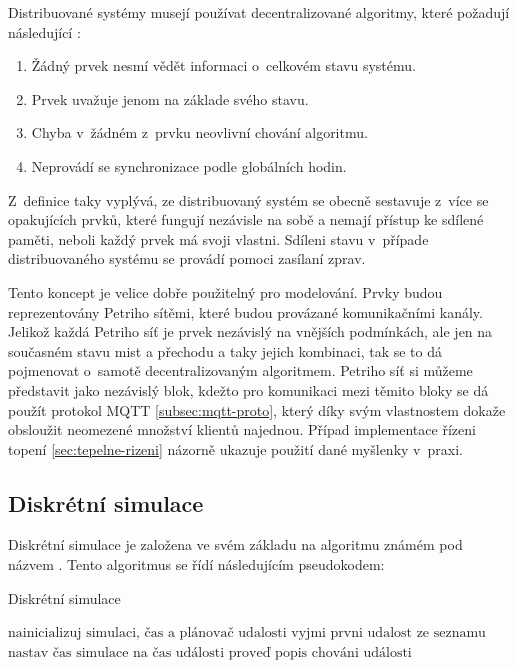 Distribuované systémy musejí používat decentralizované algoritmy, které požadují následující \cite[p.20]{distributed_systems}:
\begin{enumerate}
  \item Žádný prvek nesmí vědět informaci o~celkovém stavu systému.
  \item Prvek uvažuje jenom na základe svého stavu.
  \item Chyba v~žádném z~prvku neovlivní chování algoritmu.
  \item Neprovádí se synchronizace podle globálních hodin.
\end{enumerate}

Z~definice taky vyplývá, ze distribuovaný systém se obecně sestavuje z~více se opakujících prvků, které fungují nezávisle na sobě a nemají přístup ke sdílené paměti, neboli každý prvek má svoji vlastni. Sdíleni stavu v~případe distribuovaného systému se provádí pomoci zasílaní zprav.

Tento koncept je velice dobře použitelný pro modelování. Prvky budou reprezentovány Petriho sítěmi, které budou provázané komunikačními kanály. Jelikož každá Petriho síť je prvek nezávislý na vnějších podmínkách, ale jen na současném stavu mist a přechodu a taky jejich kombinaci, tak se to dá pojmenovat o~samotě decentralizovaným algoritmem. Petriho síť si můžeme představit jako nezávislý blok, kdežto pro komunikaci mezi těmito bloky se dá použít protokol MQTT \ref{subsec:mqtt-proto}, který díky svým vlastnostem dokaže obsloužit neomezené množství klientů najednou. Případ implementace řízeni topení \ref{sec:tepelne-rizeni} názorně ukazuje použití dané myšlenky v~praxi.

\subsection{Diskrétní simulace}
\label{subsec:disc-sim}

Diskrétní simulace je založena ve svém základu na algoritmu známém pod názvem . Tento algoritmus se řídí následujícím pseudokodem:
\begin{algorithm}
 \caption{Diskrétní simulace}\label{disc-sim-alg}
 \begin{algorithmic}[1]
 \State $\text{nainicializuj simulaci, čas a plánovač udalosti}$
 \State $\text{vyjmi prvni udalost ze seznamu}$
   \Return
 \EndIf
 \State $\text{nastav čas simulace na čas události}$
 \State $\text{proveď popis chováni události}$
 \EndWhile
 \end{algorithmic}
\end{algorithm}

